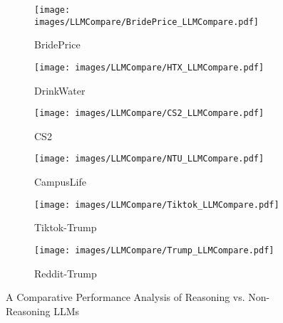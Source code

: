 \begin{figure}[htbp]
  \centering
  \begin{subfigure}[b]{0.23\textwidth}
    \centering
    \texttt{[image: images/LLMCompare/BridePrice\_LLMCompare.pdf]}
    \caption{BridePrice}
    \label{fig:LLM_compare_sub2}
  \end{subfigure}
  \hfill
  \begin{subfigure}[b]{0.23\textwidth}
    \centering
    \texttt{[image: images/LLMCompare/HTX\_LLMCompare.pdf]}
    \caption{DrinkWater}
    \label{fig:LLM_compare_sub3}
  \end{subfigure}

  \vspace{0.7cm}  %

  \begin{subfigure}[b]{0.23\textwidth}
    \centering
    \texttt{[image: images/LLMCompare/CS2\_LLMCompare.pdf]}
    \caption{CS2}
    \label{fig:LLM_compare_sub4}
  \end{subfigure}
  \hfill
  \begin{subfigure}[b]{0.23\textwidth}
    \centering
    \texttt{[image: images/LLMCompare/NTU\_LLMCompare.pdf]}
    \caption{CampusLife}
    \label{fig:LLM_compare_sub5}
  \end{subfigure}

  \vspace{0.7cm}  %

  \begin{subfigure}[b]{0.23\textwidth}
    \centering
    \texttt{[image: images/LLMCompare/Tiktok\_LLMCompare.pdf]}
    \caption{Tiktok-Trump}
    \label{fig:LLM_compare_sub6}
  \end{subfigure}
  \hfill
  \begin{subfigure}[b]{0.23\textwidth}
    \centering
    \texttt{[image: images/LLMCompare/Trump\_LLMCompare.pdf]}
    \caption{Reddit-Trump}
    \label{fig:LLM_compare_sub7}
  \end{subfigure}

  \vspace{0.7cm}  %

  \caption{A Comparative Performance Analysis of Reasoning vs. Non-Reasoning LLMs}
  \label{fig:apd_reasoning_llms}
\end{figure}